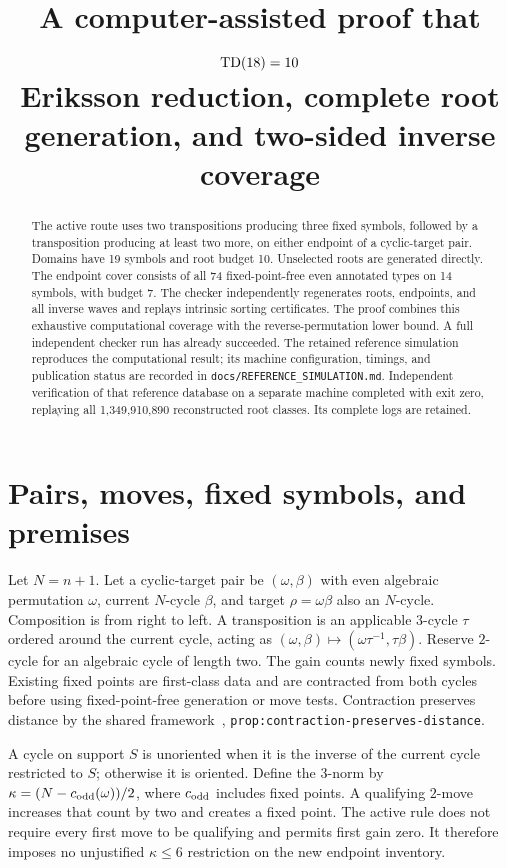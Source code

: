 \documentclass[11pt,a4paper]{article}
\title{A computer-assisted proof that $\operatorname{TD}(18)=10$\\
\large Eriksson reduction, complete root generation, and two-sided inverse coverage}
\author{}\date{}
\begin{document}
\setlength{\emergencystretch}{3em}\maketitle
\begin{abstract}
The active route uses two transpositions producing three fixed symbols, followed
by a transposition producing at least two more, on either endpoint of a
cyclic-target pair. Domains have 19 symbols and root budget 10.
Unselected roots are generated directly. The endpoint cover consists of all
74 fixed-point-free even annotated types on 14 symbols, with budget
7. The checker independently regenerates roots, endpoints, and all inverse
waves and replays intrinsic sorting certificates. The proof combines this
exhaustive computational coverage with the reverse-permutation lower bound.
A full independent checker run has already succeeded. The retained reference
simulation reproduces the computational result; its machine configuration,
timings, and publication status are recorded in
\nolinkurl{docs/REFERENCE_SIMULATION.md}. Independent verification of that
reference database on a separate machine completed with exit zero, replaying
all 1,349,910,890 reconstructed root classes. Its complete logs are retained.
\end{abstract}
\section{Pairs, moves, fixed symbols, and premises}
Let $N=n+1$. Let a cyclic-target pair be $(\omega,\beta)$ with even algebraic
permutation $\omega$, current $N$-cycle $\beta$, and target $\rho=\omega\beta$
also an $N$-cycle. Composition is from right to left. A transposition is an
applicable $3$-cycle $\tau$ ordered around the current cycle, acting as
$(\omega,\beta)\mapsto(\omega\tau^{-1},\tau\beta)$. Reserve $2$-cycle for an
algebraic cycle of length two. The gain counts newly fixed symbols. Existing
fixed points are first-class data and are contracted from both cycles before
using fixed-point-free generation or move tests. Contraction preserves distance
by the shared framework~\cite{framework},
\nolinkurl{prop:contraction-preserves-distance}.

A cycle on support $S$ is unoriented when it is the inverse of the current
cycle restricted to $S$; otherwise it is oriented. Define the $3$-norm by
$\kappa=(N-c_{\rm odd}(\omega))/2$, where $c_{\rm odd}$ includes fixed points.
A qualifying $2$-move increases that count by two and creates a fixed point.
The active rule does not require every first move to be qualifying and permits
first gain zero. It therefore imposes no unjustified $\kappa\leq6$ restriction
on the new endpoint inventory.
\end{document}
